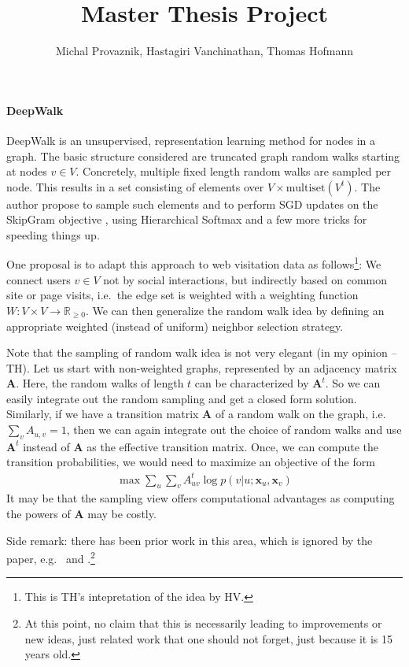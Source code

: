 \documentclass{article}
\author{Michal Provaznik, Hastagiri Vanchinathan, Thomas Hofmann}
\title{Master Thesis Project}
\renewcommand{\Re}{{\mathbb R}}
\newcommand{\mat}[1]{{\mathbf #1}}
\renewcommand{\vec}[1]{{\mathbf #1}}
\begin{document}
\maketitle

\paragraph{DeepWalk} 

DeepWalk \cite{perozzi2014deepwalk} is an unsupervised, representation learning method for nodes in a graph. The basic structure considered are truncated graph random walks starting at nodes $v  \in V$. Concretely, multiple fixed length random walks are sampled per node. This results in a set consisting of elements over $V \times \text{multiset}(V^t)$. The author propose to sample such elements and to perform SGD updates on the SkipGram objective \cite{mikolov2013efficient}, using Hierarchical Softmax \cite{mnih2009scalable} and a few more tricks for speeding things up. 

One proposal is to adapt this approach to web visitation data as follows\footnote{This is TH's intepretation of the idea by HV.}: We connect users $v \in V$ not by social interactions, but indirectly based on common site or page visits, i.e.~the edge set is weighted with a weighting function $W: V \times V \to \Re_{\ge 0}$. We can then generalize the random walk idea by defining an appropriate weighted (instead of uniform) neighbor selection strategy. 

Note that the sampling of random walk idea is not very elegant (in my opinion -- TH). Let us start with non-weighted graphs, represented by an adjacency matrix $\mat A$. Here, the random walks of length $t$ can be characterized by $\mat A^t$. So we can easily integrate out the random sampling and get a closed form solution. Similarly, if we have a transition matrix $\mat A$ of a random walk on the graph, i.e.~$\sum_v A_{u,v} = 1$, then we can again integrate out the choice of random walks and use $\mat A^t$  instead of $\mat A$ as the effective transition matrix. Once, we can compute the transition probabilities, we would need to maximize an objective of the form 
\begin{align}
\max \sum_u \sum_v A^t_{uv} \log p(v|u; \vec x_u, \vec x_v) 
\end{align}
It may be that the sampling view offers computational advantages as computing the powers of $\mat A$ may be costly. 

Side remark: there has been prior work in this area, which is ignored by the paper, e.g.~\cite{jaakkola2002partially} and \cite{tishby2000data}.\footnote{At this point, no claim that this is necessarily leading to improvements or new ideas, just related work that one should not forget, just because it is 15 years old.}
\end{document}
